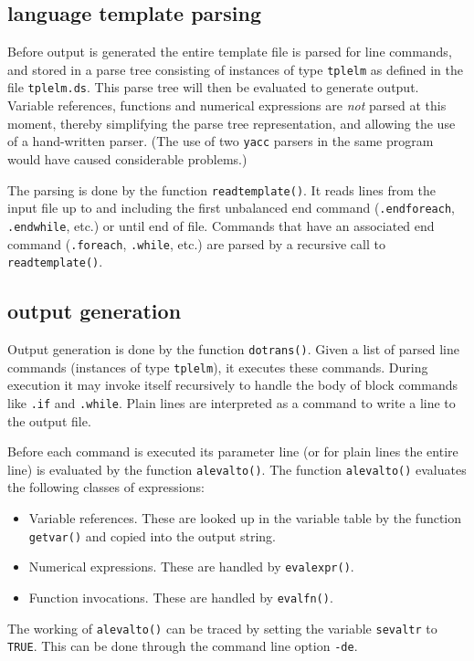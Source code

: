 \subsection{language template parsing}
Before output is generated the entire template file is parsed for line
commands, and stored in a parse tree consisting of instances of type
\texttt{tplelm} as defined in the file \texttt{tplelm.ds}.
This parse tree will then be evaluated to generate output.
Variable references, functions and numerical expressions are \emph{not}
parsed at this moment, thereby simplifying the parse tree representation,
and allowing the use of a hand-written parser.
(The use of two \texttt{yacc} parsers in the same program would have
caused considerable problems.)
\par
The parsing is done by the function \texttt{readtemplate()}.
It reads lines from the input file up to and including the first
unbalanced end command (\texttt{.endforeach}, \texttt{.endwhile}, etc.)
or until end of file.
Commands that have an associated end command (\texttt{.foreach},
\texttt{.while}, etc.) are parsed by a recursive call to \texttt{readtemplate()}.
\subsection{output generation}
Output generation is done by the function \texttt{dotrans()}.
Given a list of parsed line commands (instances of type \texttt{tplelm}),
it executes these commands.
During execution it may invoke itself recursively to handle
the body of block commands like \texttt{.if} and \texttt{.while}.
Plain lines are interpreted as a command to write a line to the
output file.
\par
Before each command is executed its parameter line (or for
plain lines the entire line) is evaluated by the function \texttt{alevalto()}.
The function \texttt{alevalto()} evaluates the following classes of
expressions:
\begin{itemize}
\item Variable references. These are looked up in the variable table 
      by the function \texttt{getvar()} and copied into the output string.

\item Numerical expressions. These are handled by \texttt{evalexpr()}.

\item Function invocations. These are handled by \texttt{evalfn()}.
\end{itemize}
The working of \texttt{alevalto()} can be traced by setting the variable
\texttt{sevaltr} to \texttt{TRUE}.
This can be done through the command line option \texttt{-de}.
